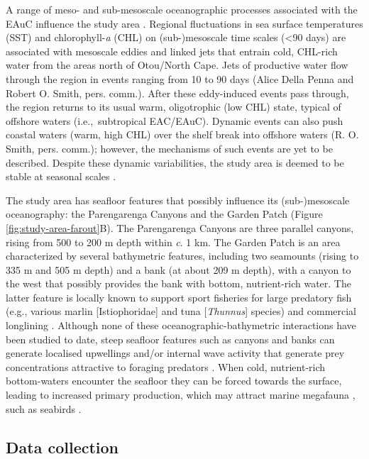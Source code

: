 \documentclass[preprint, 3p, authoryear]{elsarticle} %
\begin{document}
A range of meso- and sub-mesoscale oceanographic processes associated with the EAuC influence the study area \citep{dellapenna2021}. Regional fluctuations in sea surface temperatures (SST) and chlorophyll-\emph{a} (CHL) on (sub-)mesoscale time scales (\textless90 days) are associated with mesoscale eddies and linked jets that entrain cold, CHL-rich water from the areas north of Otou/North Cape. Jets of productive water flow through the region in events ranging from 10 to 90 days (Alice Della Penna and Robert O. Smith, pers. comm.). After these eddy-induced events pass through, the region returns to its usual warm, oligotrophic (low CHL) state, typical of offshore waters (i.e.,~subtropical EAC/EAuC). Dynamic events can also push coastal waters (warm, high CHL) over the shelf break into offshore waters (R. O. Smith, {pers. comm.}); however, the mechanisms of such events are yet to be described. Despite these dynamic variabilities, the study area is deemed to be stable at seasonal scales \citep{wijffels2018}.

The study area has seafloor features that possibly influence its (sub-)mesoscale oceanography: the Parengarenga Canyons and the Garden Patch (Figure \ref{fig:study-area-farout}B). The Parengarenga Canyons are three parallel canyons, rising from 500 to 200 m depth within \emph{c}. 1 km. The Garden Patch is an area characterized by several bathymetric features, including two seamounts (rising to 335 m and 505 m depth) and a bank (at about 209 m depth), with a canyon to the west that possibly provides the bank with bottom, nutrient-rich water. The latter feature is locally known to support sport fisheries for large predatory fish (e.g., various marlin [Istiophoridae] and tuna [\emph{Thunnus}] species) and commercial longlining \citep{richard2020}. Although none of these oceanographic-bathymetric interactions have been studied to date, steep seafloor features such as canyons and banks can generate localised upwellings and/or internal wave activity that generate prey concentrations attractive to foraging predators \citep{allen2001, sharples2013, sharples2021}. When cold, nutrient-rich bottom-waters encounter the seafloor they can be forced towards the surface, leading to increased primary production, which may attract marine megafauna \citep{bouchet2015, cox2018}, such as seabirds \citep{haney1987, scott2010, scott2013}.

\subsection{Data collection}
\end{document}
